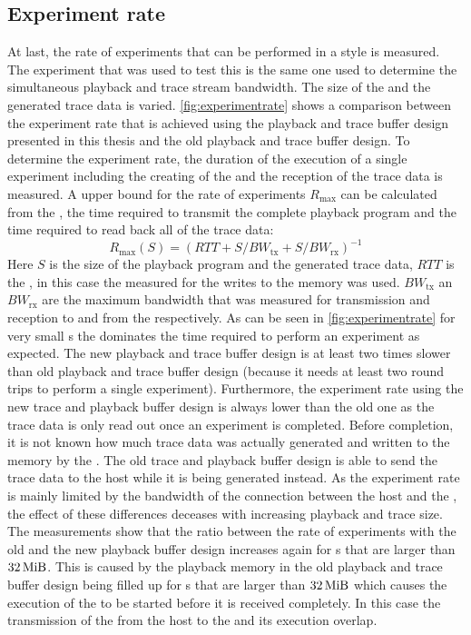 \subsection{Experiment rate}\label{sec:rate}
At last, the rate of experiments that can be performed in a \HWinTheLoop{} style is measured. The experiment that was used to test this is the same one used to determine the simultaneous playback and trace stream bandwidth. The size of the \PlaybackProgram{} and the generated trace data is varied. \autoref{fig:experimentrate} shows a comparison between the experiment rate that is achieved using the playback and trace buffer design presented in this thesis and the old playback and trace buffer design. To determine the experiment rate, the duration of the execution of a single experiment including the creating of the \PlaybackProgram{} and the reception of the trace data is measured.
A upper bound for the rate of experiments $R_{\text{max}}$ can be calculated from the \rtt{}, the time required to transmit the complete playback program and the time required to read back all of the trace data:
\[R_{\text{max}}(S) = {\left(RTT + S / BW_{\text{tx}} + S / BW_{\text{rx}}\right)}^{-1}\]
Here $S$ is the size of the playback program and the generated trace data, $RTT$ is the \rtt{}, in this case the \rtt{} measured for the \FAXI{} writes to the \DDR{} memory was used. $BW_{\text{tx}}$ an $BW_{\text{rx}}$ are the maximum bandwidth that was measured for transmission and reception to and from the \FPGA{} respectively.
As can be seen in \autoref{fig:experimentrate} for very small \PlaybackProgram{}s the \rtt{} dominates the time required to perform an experiment as expected. The new playback and trace buffer design is at least two times slower than old playback and trace buffer design (because it needs at least two round trips to perform a single experiment). Furthermore, the experiment rate using the new trace and playback buffer design is always lower than the old one as the trace data is only read out once an experiment is completed. Before completion, it is not known how much trace data was actually generated and written to the \DDR{} memory by the \AXIDMA{}. The old trace and playback buffer design is able to send the trace data to the host while it is being generated instead. As the experiment rate is mainly limited by the bandwidth of the connection between the host and the \FPGA{}, the effect of these differences deceases with increasing playback and trace size.
The measurements show that the ratio between the rate of experiments with the old and the new playback buffer design increases again for \PlaybackProgram{}s that are larger than $\SI{32}{\mebi\byte}$. This is caused by the playback memory in the old playback and trace buffer design being filled up for \PlaybackProgram{}s that are larger than $\SI{32}{\mebi\byte}$ which causes the execution of the \PlaybackProgram{} to be started before it is received completely. In this case the transmission of the \PlaybackProgram{} from the host to the \FPGA{} and its execution overlap.
